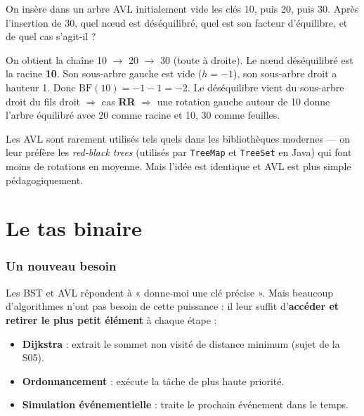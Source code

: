 \documentclass[11pt,a4paper]{article}
\begin{document}
\begin{appliboxQ}
On insère dans un arbre AVL initialement vide les clés 10, puis 20, puis 30. Après l'insertion de 30, quel nœud est déséquilibré, quel est son facteur d'équilibre, et de quel cas s'agit-il ?
\end{appliboxQ}

\begin{appliboxR}[Réponse]
On obtient la chaîne 10 $\to$ 20 $\to$ 30 (toute à droite). Le nœud déséquilibré est la racine \textbf{10}. Son sous-arbre gauche est vide ($h = -1$), son sous-arbre droit a hauteur 1. Donc $\text{BF}(10) = -1 - 1 = -2$. Le déséquilibre vient du sous-arbre droit du fils droit $\Rightarrow$ cas \textbf{RR} $\Rightarrow$ une rotation gauche autour de 10 donne l'arbre équilibré avec 20 comme racine et 10, 30 comme feuilles.
\end{appliboxR}

\begin{attentionbox}[En pratique]
Les AVL sont rarement utilisés tels quels dans les bibliothèques modernes --- on leur préfère les \emph{red-black trees} (utilisés par \texttt{TreeMap} et \texttt{TreeSet} en Java) qui font moins de rotations en moyenne. Mais l'idée est identique et AVL est plus simple pédagogiquement.
\end{attentionbox}

\part{Le tas binaire}

\section{Un nouveau besoin}

Les BST et AVL répondent à « donne-moi une clé précise ». Mais beaucoup d'algorithmes n'ont pas besoin de cette puissance : il leur suffit d'\textbf{accéder et retirer le plus petit élément} à chaque étape :
\begin{itemize}[nosep]
    \item \textbf{Dijkstra} : extrait le sommet non visité de distance minimum (sujet de la S05).
    \item \textbf{Ordonnancement} : exécute la tâche de plus haute priorité.
    \item \textbf{Simulation événementielle} : traite le prochain événement dans le temps.
\end{itemize}
\end{document}
